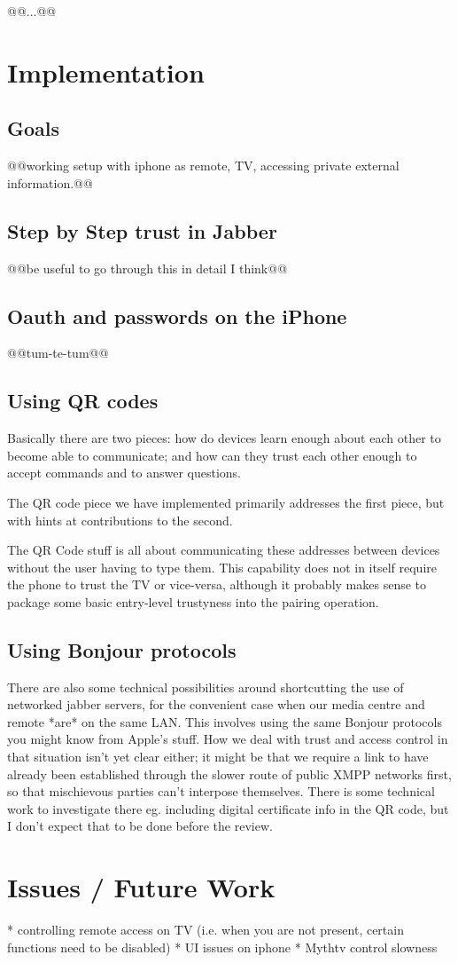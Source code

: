 \documentclass[]{article}
\begin{document}
@@...@@

\section{Implementation}

\subsection{Goals}

@@working setup with iphone as remote, TV, accessing private external information.@@

\subsection{Step by Step trust in Jabber}

@@be useful to go through this in detail I think@@

\subsection{Oauth and passwords on the iPhone}

@@tum-te-tum@@

\subsection{Using QR codes}

Basically there are two pieces: how do devices learn enough about each other to become able to communicate; and how can they trust each other enough to accept commands and to answer questions.

The QR code piece we have implemented primarily addresses the first piece, but with hints at contributions to the second.

The QR Code stuff is all about communicating these addresses between devices without the user having to type them. This capability does not in itself require the phone to trust the TV or vice-versa, although it probably makes sense to package some basic entry-level trustyness into the pairing operation.
 
\subsection{Using Bonjour protocols} 
 
There are also some technical possibilities around shortcutting the use of networked jabber servers, for the convenient case when our media centre and remote *are* on the same LAN. This involves using the same Bonjour protocols you might know from Apple's stuff. How we deal with trust and access control in that situation isn't yet clear either; it might be that we require a link to have already been established through the slower route of public XMPP networks first, so that mischievous parties can't interpose themselves. There is some technical work to investigate there eg. including digital certificate info in the QR code, but I don't expect that to be done before the review.
   


\section{Issues / Future Work}

* controlling remote access on TV (i.e. when you are not present, certain functions need to be disabled)
* UI issues on iphone
* Mythtv control slowness
\end{document}
